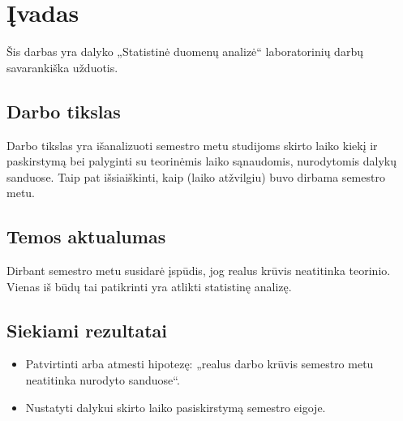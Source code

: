 \chapter{Įvadas}

Šis darbas yra dalyko „Statistinė duomenų analizė“ laboratorinių darbų
savarankiška užduotis.

\section{Darbo tikslas}

Darbo tikslas yra išanalizuoti semestro metu studijoms skirto laiko
kiekį ir paskirstymą bei palyginti su teorinėmis laiko sąnaudomis,
nurodytomis dalykų sanduose. Taip pat išsiaiškinti, kaip (laiko atžvilgiu)
buvo dirbama semestro metu.

\section{Temos aktualumas}

Dirbant semestro metu susidarė įspūdis, jog realus krūvis neatitinka
teorinio. Vienas iš būdų tai patikrinti yra atlikti statistinę analizę.

\section{Siekiami rezultatai}

\begin{itemize}
  \item Patvirtinti arba atmesti hipotezę: „realus darbo krūvis
    semestro metu neatitinka nurodyto sanduose“.
  \item Nustatyti dalykui skirto laiko pasiskirstymą semestro eigoje.
\end{itemize}
